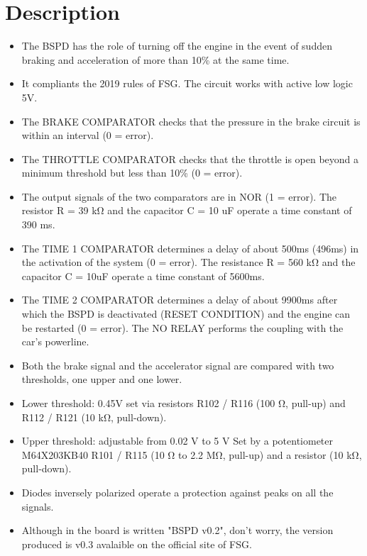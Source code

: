 \documentclass[a4paper,12pt,oneside,pdflatex,italian,final,twocolumn]{article}
\begin{document}
\section{Description}
\begin{itemize}

\item  The BSPD has the role of turning off the engine in the event of sudden braking and
acceleration of more than 10\% at the same time.
\item  It compliants the 2019 rules of FSG.
The circuit works with active low logic 5V.
\item  The BRAKE COMPARATOR checks that the pressure in the brake circuit is within an interval
(0 = error).
\item  The THROTTLE COMPARATOR checks that the throttle is open beyond a minimum
threshold but less than 10\% (0 = error).
\item The output signals of the two comparators are in NOR (1 = error).
The resistor R = 39 k\si{\ohm} and the capacitor C = 10 uF operate a time constant of 390 ms.
\item  The TIME 1 COMPARATOR determines a delay of about 500ms (496ms) in the activation of the system (0 = error).
The resistance R = 560 k\si{\ohm} and the capacitor C = 10uF operate a time constant of 5600ms.
\item  The TIME 2 COMPARATOR determines a delay of about 9900ms after which the BSPD is
deactivated (RESET CONDITION) and the engine can be restarted (0 = error).
The NO RELAY performs the coupling with the car's powerline.
\item Both the brake signal and the accelerator signal are compared with two
thresholds, one upper and one lower.
\item Lower threshold: 0.45V set via resistors R102 / R116 (100 \si{\ohm}, pull-up) and R112 / R121 (10 k\si{\ohm}, pull-down).
\item Upper threshold: adjustable from 0.02 V to 5 V Set by a potentiometer M64X203KB40 R101 / R115 (10 \si{\ohm} to 2.2 M\si{\ohm}, pull-up) and a resistor (10 k\si{\ohm}, pull-down).
\item  Diodes inversely polarized operate a protection against peaks on all the signals.
\item  Although in the board is written "BSPD v0.2", don't worry, the version produced is v0.3 avalaible on the official site of FSG.
\end{itemize}
\end{document}
